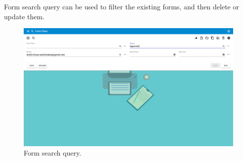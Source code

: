 Form search query can be used to filter the existing forms, and then delete or update them. 
\begin{figure}[!htbp]
\centering
\includegraphics[width=0.95\linewidth]{sections/forms/images/form_class_centre.png}
\caption{Form search query.}\label{sections/forms/images/form_class_centre}
\end{figure}
\newpage

